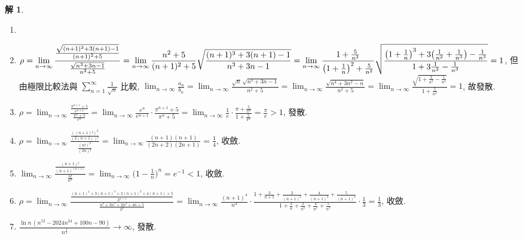 \documentclass[12pt]{extarticle}
\newcommand{\ds}{\displaystyle}
\theoremstyle{definition}
\newtheorem*{sol}{解}
\begin{document}
\begin{sol}
  \begin{enumerate}\setlength{\itemsep}{0pt}
    \item[]
    \item $\ds\rho = \lim_{n\to\infty}\frac{\frac{\sqrt{(n + 1)^3 + 3(n + 1) - 1}}{(n+1)^2 + 5}}{\frac{\sqrt{n^3 + 3n - 1}}{n^2 + 5}} = \lim_{n\to\infty}\frac{n^2 + 5}{(n+1)^2 + 5}\sqrt{\frac{(n + 1)^3 + 3(n + 1) - 1}{n^3 + 3n - 1}} \\= \lim_{n\to\infty}\frac{1 + \frac{5}{n^2}}{\big(1 + \frac{1}{n}\big)^2 + \frac{5}{n^2}}\sqrt{\frac{\big(1 + \frac{1}{n}\big)^3 + 3\big(\frac{1}{n^2} + \frac{1}{n^3}\big) - \frac{1}{n^3}}{1 + 3\frac{1}{n^2} - \frac{1}{n^3}}} = 1$, 但由極限比較法與 $\ds\sum_{n = 1}^\infty\frac{1}{\sqrt{n}}$ 比較, $\ds\lim_{n\to\infty}\frac{a_n}{b_n} = \lim_{n\to\infty}\frac{\sqrt{n}\,\sqrt{n^3 + 3n - 1}}{n^2 + 5} = \lim_{n\to\infty}\frac{\sqrt{n^4 + 3n^2 - n}}{n^2 + 5} = \lim_{n\to\infty}\frac{\sqrt{1 + \frac{3}{n^2} - \frac{1}{n^3}}}{1 + \frac{5}{n^2}} = 1$, 故發散. 
    \item $\ds\rho = \lim_{n\to\infty}\frac{\frac{\pi^{n+1} + 5}{e^{n + 1}}}{\frac{\pi^n + 5}{e^n}} = \lim_{n\to\infty}\frac{e^n}{e^{n+1}}\cdot\frac{\pi^{n + 1} + 5}{\pi^n + 5} = \lim_{n\to\infty}\frac{1}{e}\cdot\frac{\pi + \frac{5}{\pi^n}}{1 + \frac{5}{\pi^n}} = \frac{\pi}{e} > 1$, 發散. 
    \item $\ds\rho = \lim_{n\to\infty}\frac{\frac{((n + 1)!)^2}{(2(n + 1))!}}{\frac{(n!)^2}{(2n)!}} = \lim_{n\to\infty}\frac{(n + 1)(n + 1)}{(2n + 2)(2n + 1)} = \frac{1}{4}$, 收斂. 
    \item $\ds\lim_{n\to\infty}\frac{\frac{(n + 1)!}{(n + 1)^{(n + 1)}}}{\frac{n!}{n^n}} = \lim_{n\to\infty}\Big(1 - \frac{1}{n}\Big)^n = e^{-1} < 1$, 收斂. 
    \item $\ds\rho = \lim_{n\to\infty}\frac{\frac{(n + 1)^4 + 3(n + 1)^3 + 2(n + 1)^2 + 4(n + 1) + 5}{3^{n + 1}}}{\frac{n^4 + 3n^3 + 2n^2 + 4n + 5}{3^n}} = \lim_{n\to\infty}\frac{(n + 1)^4}{n^4}\cdot\frac{1 + \frac{3}{n + 1} + \frac{2}{(n + 1)^2} + \frac{4}{(n + 1)^3} + \frac{5}{(n + 1)^4}}{1 + \frac{3}{n} + \frac{2}{n^2} + \frac{4}{n^3} + \frac{5}{n^4}}\cdot\frac{1}{3} = \frac{1}{3}$, 收斂. 
    \item $\ds\frac{\ln n\,(n^{52} - 2024 n^{24} + 100 n - 90)}{n^{\frac{3}{2}}}\to\infty$, 發散.  
  \end{enumerate}
\end{sol}
\end{document}
